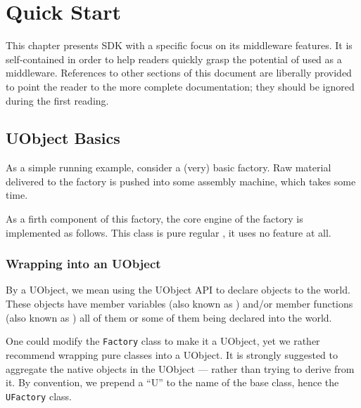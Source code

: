\chapter{Quick Start}
\label{sec:uob:quick}

This chapter presents \urbi SDK with a specific focus on its
middleware features.  It is self-contained in order to help readers
quickly grasp the potential of \urbi used as a middleware.  References
to other sections of this document are liberally provided to point the
reader to the more complete documentation; they should be ignored
during the first reading.

\section{UObject Basics}

As a simple running example, consider a (very) basic factory.  Raw
material delivered to the factory is pushed into some assembly machine,
which takes some time.

As a firth component of this factory, the core engine of the factory
is implemented as follows.  This class is pure regular \Cxx, it uses
no \urbi feature at all.

\newcommand{\factoryDir}{\uobjectsDir/factory/factory.uob}



\subsection{Wrapping into an UObject}

By  a UObject, we mean using the UObject API to declare
objects to the \urbi world.  These objects have member variables (also
known as ) and/or member functions (also known as
) all of them or some of them being declared into the
\urbi world.

One could modify the \lstinline|Factory| class to make it a UObject,
yet we rather recommend wrapping pure \Cxx classes into a UObject.  It
is strongly suggested to aggregate the native \Cxx objects in the
UObject --- rather than trying to derive from it.  By convention, we
prepend a ``U'' to the name of the base class, hence the
\lstinline|UFactory| class.



